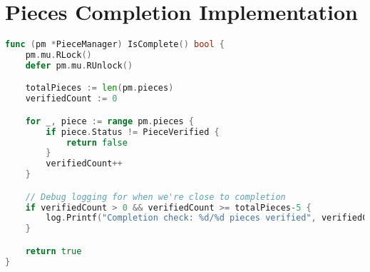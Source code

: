 \documentclass[12pt,a4paper]{report}
\begin{document}
\section{Pieces Completion Implementation}
\begin{lstlisting}[language=Go, caption={Pieces Completion Code}, label={lst:piece-completion}]
func (pm *PieceManager) IsComplete() bool {
	pm.mu.RLock()
	defer pm.mu.RUnlock()

	totalPieces := len(pm.pieces)
	verifiedCount := 0

	for _, piece := range pm.pieces {
		if piece.Status != PieceVerified {
			return false
		}
		verifiedCount++
	}

	// Debug logging for when we're close to completion
	if verifiedCount > 0 && verifiedCount >= totalPieces-5 {
		log.Printf("Completion check: %d/%d pieces verified", verifiedCount, totalPieces)
	}

	return true
}
\end{lstlisting}
\end{document}
